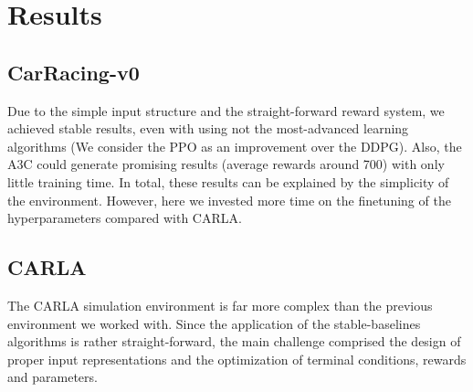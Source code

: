 \documentclass[letterpaper, 10 pt, conference]{ieeeconf}  %
\begin{document}

\section{Results}
\subsection{CarRacing-v0}
Due to the simple input structure and the straight-forward reward system, we achieved stable results, 
even with using not the most-advanced learning algorithms (We consider the PPO as an improvement over the DDPG). 
Also, the A3C could generate promising results (average rewards around 700) with only little training time.  
In total, these results can be explained by the simplicity of the environment. However, here we invested more time on 
the finetuning of the hyperparameters compared with CARLA.
\subsection{CARLA}
The CARLA simulation environment is far more complex than the previous environment we worked with. 
Since the application of the stable-baselines algorithms is rather straight-forward, the main challenge comprised the design of proper input 
representations and the optimization of terminal conditions, rewards and parameters.
\end{document}
